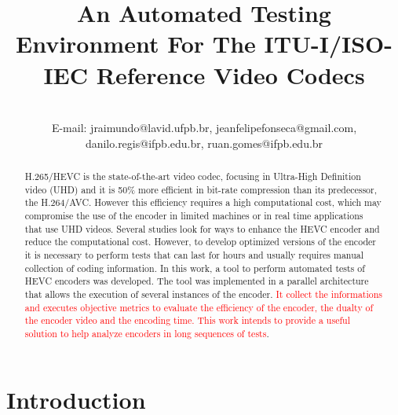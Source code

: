 \documentclass[journal]{IEEEtran}
\begin{document}
\title{An Automated Testing Environment For The ITU-I/ISO-IEC Reference Video Codecs}

\author{
							
\\E-mail:  jraimundo@lavid.ufpb.br, jeanfelipefonseca@gmail.com, danilo.regis@ifpb.edu.br, ruan.gomes@ifpb.edu.br
}


\maketitle
\begin{abstract}

H.265/HEVC is the state-of-the-art video codec, focusing in Ultra-High Definition video (UHD) and it is 50\% more efficient in bit-rate compression than its predecessor, the H.264/AVC. However this efficiency requires a high computational cost, which may compromise the use of the encoder in limited machines or in real time applications that use UHD videos. Several studies look for ways to enhance the HEVC encoder and reduce the computational cost. However, to develop optimized versions of the encoder it is necessary to perform tests that can last for hours and usually requires manual collection of coding information.  In this work, a tool to perform automated tests of HEVC encoders  was developed. The tool was implemented in a parallel architecture that allows the execution of several instances of the encoder. \textcolor{red}{It collect the informations and executes objective metrics to evaluate the efficiency of the encoder, the dualty of the encoder video and the encoding time. This work intends to provide a useful solution to help analyze encoders in long sequences of tests}.

\end{abstract}


\section{Introduction}
\end{document}

